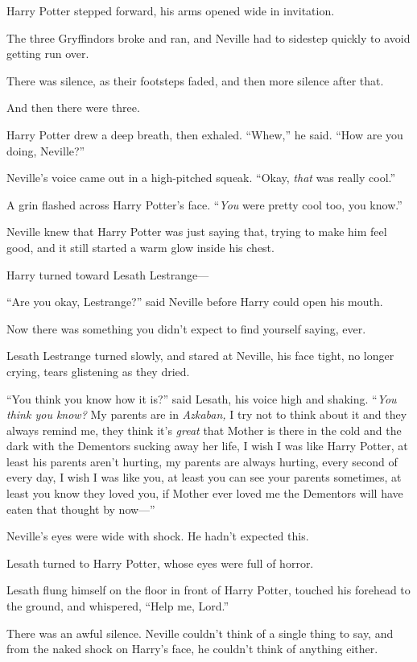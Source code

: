 Harry Potter stepped forward, his arms opened wide in invitation.

The three Gryffindors broke and ran, and Neville had to sidestep quickly to avoid getting run over.

There was silence, as their footsteps faded, and then more silence after that.

And then there were three.

Harry Potter drew a deep breath, then exhaled. “Whew,” he said. “How are you doing, Neville?”

Neville’s voice came out in a high-pitched squeak. “Okay, \emph{that} was really cool.”

A grin flashed across Harry Potter’s face. “\emph{You} were pretty cool too, you know.”

Neville knew that Harry Potter was just saying that, trying to make him feel good, and it still started a warm glow inside his chest.

Harry turned toward Lesath Lestrange—

“Are you okay, Lestrange?” said Neville before Harry could open his mouth.

Now there was something you didn’t expect to find yourself saying, ever.

Lesath Lestrange turned slowly, and stared at Neville, his face tight, no longer crying, tears glistening as they dried.

“You think you know how it is?” said Lesath, his voice high and shaking. “\emph{You think you know?} My parents are in \emph{Azkaban,} I try not to think about it and they always remind me, they think it’s \emph{great} that Mother is there in the cold and the dark with the Dementors sucking away her life, I wish I was like Harry Potter, at least his parents aren’t hurting, my parents are always hurting, every second of every day, I wish I was like you, at least you can see your parents sometimes, at least you know they loved you, if Mother ever loved me the Dementors will have eaten that thought by now—”

Neville’s eyes were wide with shock. He hadn’t expected this.

Lesath turned to Harry Potter, whose eyes were full of horror.

Lesath flung himself on the floor in front of Harry Potter, touched his forehead to the ground, and whispered, “Help me, Lord.”

There was an awful silence. Neville couldn’t think of a single thing to say, and from the naked shock on Harry’s face, he couldn’t think of anything either.


